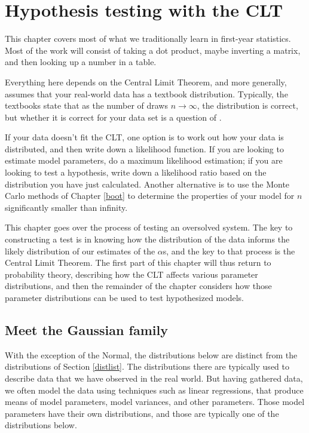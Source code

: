 \startonecol \chapter[Gaussian tricks]{Hypothesis testing with the CLT} \label{testing} \label{gauss} \endonecol

This chapter covers most of what we traditionally learn in first-year statistics. 
 Most of the work will consist of taking a dot product, maybe inverting a matrix,
and then looking up a number in a table. 

Everything here depends on the Central Limit Theorem, and more
generally, assumes that your real-world data has a textbook
distribution. Typically, the textbooks state that as the number of draws
$n \to \infty$, the distribution is correct, but whether it is correct
for your data set is a question of .

If your data doesn't fit the CLT, one option is to work out how your data
is distributed, and then write down a likelihood function. If you are
looking to estimate model parameters, do a maximum likelihood estimation;
if you are looking to test a hypothesis, write down a likelihood ratio
based on the distribution you have just calculated.  Another alternative
is to use the Monte Carlo methods of Chapter \ref{boot} to determine
the properties of your model for $n$ significantly smaller than infinity.

This chapter goes over the process of testing an oversolved system. The
key to constructing a test is in knowing how the distribution of the
data informs the likely distribution of our estimates of the $\alpha$s,
and the key to that process is the Central Limit Theorem. The first part
of this chapter will thus return to probability theory, describing how
the CLT affects various parameter distributions, and then the remainder
of the chapter considers how those parameter distributions can be used
to test hypothesized models.

\section{Meet the Gaussian family} \label{dist2}
With the exception of the Normal, the distributions below are distinct
from the distributions of Section \ref{distlist}. The distributions
there
are typically used to describe data that we have observed in the real
world. But having gathered data, we often model the data using techniques
such as linear regressions, that produce means of model parameters,
model variances, and other parameters. Those model parameters have their
own distributions, and those are typically one of the distributions below.


